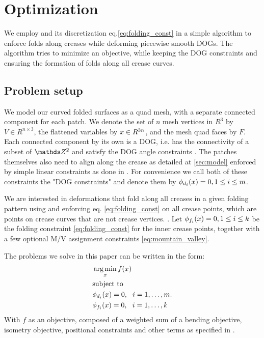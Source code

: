 \section{Optimization} \label{sec:implementation}
We employ  and its discretization eq.\eqref{eq:folding_const} in a simple algorithm to enforce folds along creases while deforming piecewise smooth DOGs. The algorithm tries to minimize an objective, while keeping the DOG constraints and ensuring the formation of folds along all crease curves.

\subsection{Problem setup}
We model our curved folded surfaces as a quad mesh, with a separate connected component for each patch. We denote the set of $n$ mesh vertices in $R^3$ by $V \in R^{n\times3}$, the flattened variables by $x \in R^{3n}$, and the mesh quad faces by $F$. Each connected component by its own is a DOG, i.e. has the connectivity of a subset of $\Z^2$ and satisfy the DOG angle constraints \cite{rabi18}. The patches themselves also need to align along the crease as detailed at \ref{sec:model} enforced by simple linear constraints as done in \cite{rabi2018shape}. For convenience we call both of these constraints the "DOG constraints" and denote them by $\phi_{d_i}(x) = 0, 1 \leq i \leq m$.

We are interested in deformations that fold along all creases in a given folding pattern using  and enforcing eq. \eqref{eq:folding_const} on all crease points, which are points on crease curves that are not crease vertices. . Let $\phi_{f_i}(x) = 0, 1 \leq i \leq k$ be the folding constraint \eqref{eq:folding_const} for the inner crease points, together with a few optional M/V assignment constraints \eqref{eq:mountain_valley}.

The problems we solve in this paper can be written in the form:
\begin{equation} \label{eq:const_opt}
\begin{aligned}
& \operatorname*{arg\,min}_x f(x) \\
& \textrm{subject to} \\
& \phi_{d_i}(x) = 0, \ \  i = 1, \ldots, m. \\
& \phi_{f_i}(x) = 0, \ \  i = 1, \ldots, k \\ 
\end{aligned}
\end{equation}
With $f$ as an objective, composed of a weighted sum of a bending objective, isometry objective, positional constraints and other terms as specified in .

